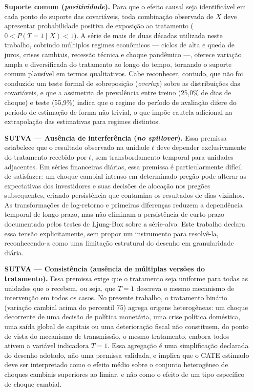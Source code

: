 \documentclass[	12pt, Times, openright, oneside, a4paper, english, brazil]{abntex2}
\begin{document}
\textbf{Suporte comum (\textit{positividade}).} Para que o efeito causal seja identificável em cada ponto do suporte das covariáveis, toda combinação observada de $X$ deve apresentar probabilidade positiva de exposição ao tratamento ($0 < P(T=1 \mid X) < 1$). A série de mais de duas décadas utilizada neste trabalho, cobrindo múltiplos regimes econômicos — ciclos de alta e queda de juros, crises cambiais, recessão técnica e choque pandêmico —, oferece variação ampla e diversificada do tratamento ao longo do tempo, tornando o suporte comum plausível em termos qualitativos. Cabe reconhecer, contudo, que não foi conduzido um teste formal de sobreposição (\textit{overlap}) sobre as distribuições das covariáveis, e que a assimetria de prevalência entre treino (25,0\% de dias de choque) e teste (55,9\%) indica que o regime do período de avaliação difere do período de estimação de forma não trivial, o que impõe cautela adicional na extrapolação das estimativas para regimes distintos.

\textbf{SUTVA — Ausência de interferência (\textit{no spillover}).} Essa premissa estabelece que o resultado observado na unidade $t$ deve depender exclusivamente do tratamento recebido por $t$, sem transbordamento temporal para unidades adjacentes. Em séries financeiras diárias, essa premissa é particularmente difícil de satisfazer: um choque cambial intenso em determinado pregão pode alterar as expectativas dos investidores e suas decisões de alocação nos pregões subsequentes, criando persistência que contamina os resultados de dias vizinhos. As transformações de log-retorno e primeiras diferenças reduzem a dependência temporal de longo prazo, mas não eliminam a persistência de curto prazo documentada pelos testes de Ljung-Box sobre a série-alvo. Este trabalho declara essa tensão explicitamente, sem propor um instrumento para resolvê-la, reconhecendo-a como uma limitação estrutural do desenho em granularidade diária.

\textbf{SUTVA — Consistência (ausência de múltiplas versões do tratamento).} Essa premissa exige que o tratamento seja uniforme para todas as unidades que o recebem, ou seja, que $T=1$ descreva o mesmo mecanismo de intervenção em todos os casos. No presente trabalho, o tratamento binário (variação cambial acima do percentil 75) agrega origens heterogêneas: um choque decorrente de uma decisão de política monetária, uma crise política doméstica, uma saída global de capitais ou uma deterioração fiscal não constituem, do ponto de vista do mecanismo de transmissão, o mesmo tratamento, embora todos ativem a variável indicadora $T=1$. Essa agregação é uma simplificação declarada do desenho adotado, não uma premissa validada, e implica que o CATE estimado deve ser interpretado como o efeito médio sobre o conjunto heterogêneo de choques cambiais superiores ao limiar, e não como o efeito de um tipo específico de choque cambial.
\end{document}
